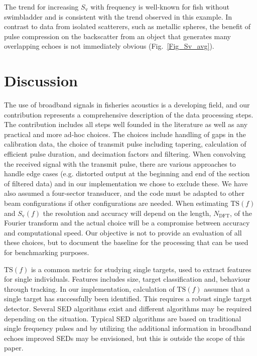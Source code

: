 \documentclass[preprint,12pt,TurnOnLineNumbers]{JASAnew}
\newcommand{\freqsym}{f}
\newcommand{\ts}{\textrm{TS}}
\newcommand{\sv}{S_{\textrm{v}}}
\newcommand{\ndft}{{N_{\textrm{DFT}}}}
\begin{document}
The trend for increasing $\sv$ with frequency is well-known for fish without swimbladder \citep{korneliussen2010} and is consistent with the trend observed in this example. In contrast to data from isolated scatterers, such as metallic spheres, the benefit of pulse compression on the backscatter from an object that generates many overlapping echoes is not immediately obvious (Fig.~\ref{Fig_Sv_avg}).

\section{Discussion}

The use of broadband signals in fisheries acoustics is a developing field, and our contribution represents a comprehensive description of the data processing steps. The contribution includes all steps well founded in the literature as well as any practical and more ad-hoc choices. The choices include handling of gaps in the calibration data, the choice of transmit pulse including tapering, calculation of efficient pulse duration, and decimation factors and filtering. When convolving the received signal with the transmit pulse, there are various approaches to handle edge cases (e.g. distorted output at the beginning and end of the section of filtered data) and in our implementation we chose to exclude these. We have also assumed a four-sector transducer, and the code must be adapted to other beam configurations if other configurations are needed. When estimating $\ts(\freqsym)$ and $\sv(\freqsym)$ the resolution and accuracy will depend on the length, $\ndft$, of the Fourier transform and the actual choice will be a compromise between accuracy and computational speed. Our objective is not to provide an evaluation of all these choices, but to document the baseline for the processing that can be used for benchmarking purposes.

$\ts(\freqsym)$ is a common metric for studying single targets, used to extract features for single individuals. Features includes size, target classification and, behaviour through tracking. In our implementation, calculation of $\ts(\freqsym)$ assumes that a single target has successfully been identified. This requires a robust single target detector. Several SED algorithms exist and different algorithms may be required depending on the situation. Typical SED algorithms are based on traditional single frequency pulses and by utilizing the additional information in broadband echoes improved SEDs may be envisioned, but this is outside the scope of this paper.
\end{document}
